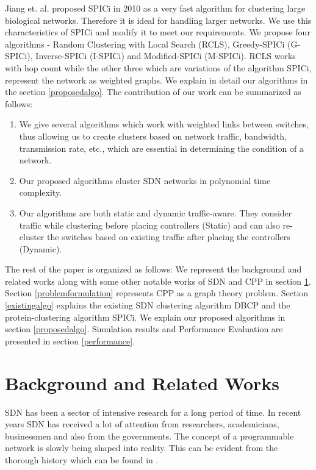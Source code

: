 \documentclass[a4paper,twocolumn,preprint]{elsarticle}
\begin{document}
Jiang et. al.\cite{spici2010} proposed SPICi in 2010 as a very fast algorithm for clustering large biological networks. Therefore it is ideal for handling larger networks. We use this characteristics of SPICi and modify it to meet our requirements. We propose four algorithms - Random Clustering with Local Search (RCLS), Greedy-SPICi (G-SPICi), Inverse-SPICi (I-SPICi) and Modified-SPICi (M-SPICi). RCLS works with hop count while the other three which are variations of the algorithm SPICi, represent the network as weighted graphs. We explain in detail our algorithms in the section \ref{proposedalgo}. The contribution of our work can be summarized as follows:
\begin{enumerate}
	\item We give several algorithms which work with weighted links between switches, thus allowing us to create clusters based on network traffic, bandwidth, transmission rate, etc., which are essential in determining the condition of a network.
	\item Our proposed algorithms cluster SDN networks in polynomial time complexity.
	\item Our algorithms are both static and dynamic traffic-aware. They consider traffic while clustering before placing controllers (Static) and can also re-cluster the switches based on existing traffic after placing the controllers (Dynamic). 
\end{enumerate}

The rest of the paper is organized as follows: We represent the background and related works along with some other notable works of SDN and CPP in section \ref{relatedworks}. Section \ref{problemformulation} represents CPP as a graph theory problem. Section \ref{existingalgo} explains the existing SDN clustering algorithm DBCP and the protein-clustering algorithm SPICi. We explain our proposed algorithms in section \ref{proposedalgo}. Simulation results and Performance Evaluation are presented in section \ref{performance}.

\section{Background and Related Works} \label{relatedworks}
SDN has been a sector of intensive research for a long period of time. In recent years SDN has received a lot of attention from researchers, academicians, businessmen and also from the governments. The concept of a programmable network is slowly being shaped into reality. This can be evident from the thorough history which can be found in \cite{sdnrao2014,sdnsurvey2015,sdnsurvey2017}.
\end{document}
